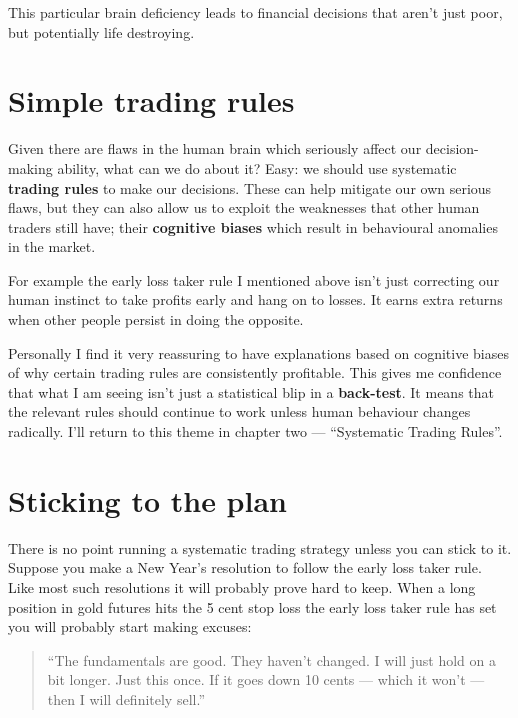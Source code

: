 This particular brain deficiency leads to financial decisions that aren't just poor, but potentially life destroying.

\section*{Simple trading rules}  {}

Given there are flaws in the human brain which seriously affect our decision-making ability, what can we do about it? Easy: we should use systematic \textbf{trading rules} to make our decisions. These can help mitigate our own serious flaws, but they can also allow us to exploit the weaknesses that other human traders still have; their \textbf{cognitive biases} which result in behavioural anomalies in the market.

For example the early loss taker rule I mentioned above isn't just correcting our human instinct to take profits early and hang on to losses. It earns extra returns when other people persist in doing the opposite.

Personally I find it very reassuring to have explanations based on cognitive biases of why certain trading rules are consistently profitable. This gives me confidence that what I am seeing isn't just a statistical blip in a \textbf{back-test}. It means that the relevant rules should continue to work unless human behaviour changes radically. I'll return to this theme in chapter two --- ``Systematic Trading Rules''.

\section*{Sticking to the plan}  {}

There is no point running a systematic trading strategy unless you can stick to it. Suppose you make a New Year's resolution to follow the early loss taker rule. Like most such resolutions it will probably prove hard to keep. When a long position in gold futures hits the 5 cent stop loss the early loss taker rule has set you will probably start making excuses:

\begin{quote}
``The fundamentals are good. They haven't changed. I will just hold on a bit longer. Just this once. If it goes down 10 cents --- which it won't --- then I will definitely sell.''
\end{quote}

